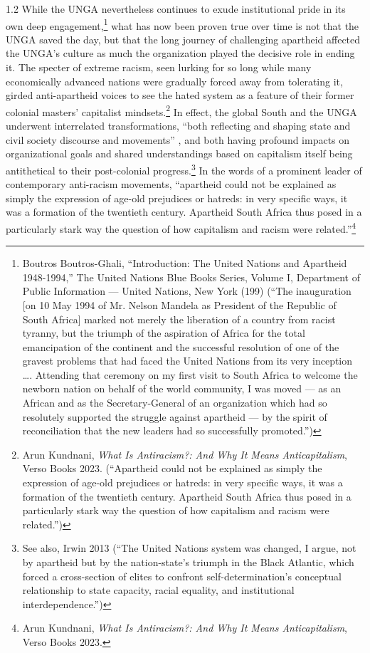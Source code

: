 \documentclass[../unravbook.tex]{subfiles}
\begin{document}
\begin{spacing}{1.2}
While the UNGA nevertheless continues to exude institutional pride in its own deep engagement,\footnote{Boutros Boutros-Ghali, ``Introduction: The United Nations and Apartheid 1948-1994,'' The United Nations Blue Books Series, Volume I, Department of Public Information --- United Nations, New York (199) (\enquote{The inauguration [on 10 May 1994 of Mr. Nelson Mandela as President of the Republic of South Africa] marked not merely the liberation of a country from racist tyranny, but the triumph of the aspiration of Africa for the total emancipation of the continent and the successful resolution of one of the gravest problems that had faced the United Nations from its very inception \ldots. Attending that ceremony on my first visit to South Africa to welcome the newborn nation on behalf of the world community, I was moved --- as an African and as the Secretary-General of an organization which had so resolutely supported the struggle against apartheid --- by the spirit of reconciliation that the new leaders had so successfully promoted.})} what has now been proven true over time is not that the UNGA saved the day, but that the long journey of challenging apartheid affected the UNGA's culture as much the organization played the decisive role in ending it. The specter of extreme racism, seen lurking for so long while many economically advanced nations were gradually forced away from tolerating it, girded anti-apartheid voices to see the hated system as a feature of their former colonial masters' capitalist mindsets.\footnote{Arun Kundnani, \textit{What Is Antiracism?: And Why It Means Anticapitalism}, Verso Books 2023. (``Apartheid could not be explained as simply the expression of age-old prejudices or hatreds: in very specific ways, it was a formation of the twentieth century. Apartheid South Africa thus posed in a particularly stark way the question of how capitalism and racism were related.'')} In effect, the global South and the UNGA underwent interrelated transformations, \enquote{both reflecting and shaping state and civil society discourse and movements} \parencite[227]{Abu-Laban-2020}, and both having profound impacts on organizational goals and shared understandings based on capitalism itself being antithetical to their post-colonial progress.\footnote{See also, Irwin 2013 (``The United Nations system was changed, I argue, not by apartheid but by the nation-state's triumph in the Black Atlantic, which forced a cross-section of elites to confront self-determination's conceptual relationship to state capacity, racial equality, and institutional interdependence.'')} In the words of a prominent leader of contemporary anti-racism movements, ``apartheid could not be explained as simply the expression of age-old prejudices or hatreds: in very specific ways, it was a formation of the twentieth century. Apartheid South Africa thus posed in a particularly stark way the question of how capitalism and racism were related.''\footnote{Arun Kundnani, \textit{What Is Antiracism?: And Why It Means Anticapitalism}, Verso Books 2023.}


\end{spacing}
\end{document}
